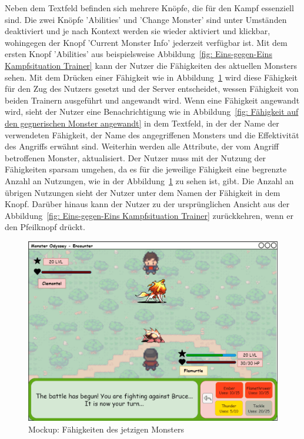 Neben dem Textfeld befinden sich mehrere Knöpfe, die für den Kampf essenziell sind. Die zwei Knöpfe 'Abilities' und 'Change Monster' sind unter Umständen deaktiviert und je nach Kontext werden sie wieder aktiviert und klickbar, wohingegen der Knopf 'Current Monster Info' jederzeit verfügbar ist.
Mit dem ersten Knopf 'Abilities' aus beispielsweise Abbildung~\ref{fig: Eins-gegen-Eins Kampfsituation Trainer} kann der Nutzer die Fähigkeiten des aktuellen Monsters sehen. 
Mit dem Drücken einer Fähigkeit wie in Abbildung~\ref{fig: Fähigkeiten des jetzigen Monsters} wird diese Fähigkeit für den Zug des Nutzers gesetzt und der Server entscheidet, wessen Fähigkeit von beiden Trainern ausgeführt und angewandt wird.
Wenn eine Fähigkeit angewandt wird, sieht der Nutzer eine Benachrichtigung wie in Abbildung~\ref{fig: Fähigkeit auf den gegnerischen Monster angewandt} in dem Textfeld, in der der Name der verwendeten Fähigkeit, der Name des angegriffenen Monsters und die Effektivität des Angriffs erwähnt sind.
Weiterhin werden alle Attribute, der vom Angriff betroffenen Monster, aktualisiert.
Der Nutzer muss mit der Nutzung der Fähigkeiten sparsam umgehen, da es für die jeweilige Fähigkeit eine begrenzte Anzahl an Nutzungen, wie in der Abbildung~\ref{fig: Fähigkeiten des jetzigen Monsters} zu sehen ist, gibt.
Die Anzahl an übrigen Nutzungen sieht der Nutzer unter dem Namen der Fähigkeit in dem Knopf.
Darüber hinaus kann der Nutzer zu der ursprünglichen Ansicht aus der Abbildung~\ref{fig: Eins-gegen-Eins Kampfsituation Trainer} zurückkehren, wenn er den Pfeilknopf drückt.
\begin{figure}[H]
    \center
    \includegraphics[scale=\scale]{images/mockups/Encounter/Encounter1v1Abilities.png}
    \caption{Mockup: Fähigkeiten des jetzigen Monsters}
    \label{fig: Fähigkeiten des jetzigen Monsters}
\end{figure}
